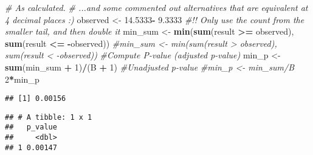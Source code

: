 \documentclass[]{article}
\newenvironment{Shaded}{\begin{snugshade}}{\end{snugshade}}
\newcommand{\KeywordTok}[1]{\textcolor[rgb]{0.13,0.29,0.53}{\textbf{#1}}}
\newcommand{\DataTypeTok}[1]{\textcolor[rgb]{0.13,0.29,0.53}{#1}}
\newcommand{\DecValTok}[1]{\textcolor[rgb]{0.00,0.00,0.81}{#1}}
\newcommand{\FloatTok}[1]{\textcolor[rgb]{0.00,0.00,0.81}{#1}}
\newcommand{\StringTok}[1]{\textcolor[rgb]{0.31,0.60,0.02}{#1}}
\newcommand{\CommentTok}[1]{\textcolor[rgb]{0.56,0.35,0.01}{\textit{#1}}}
\newcommand{\OperatorTok}[1]{\textcolor[rgb]{0.81,0.36,0.00}{\textbf{#1}}}
\newcommand{\NormalTok}[1]{#1}
\begin{document}
\begin{Shaded}
\begin{Highlighting}[]
\CommentTok{# As calculated.}
\CommentTok{# ...and some commented out alternatives that are equivalent at 4 decimal places :)}
\NormalTok{observed <-}\StringTok{ }\FloatTok{14.5333}\OperatorTok{-}\StringTok{ }\FloatTok{9.3333} 
\CommentTok{#!! Only use the count from the smaller tail, and then double it}
\NormalTok{min_sum <-}\StringTok{ }\KeywordTok{min}\NormalTok{(}\KeywordTok{sum}\NormalTok{(result }\OperatorTok{>=}\StringTok{ }\NormalTok{observed), }\KeywordTok{sum}\NormalTok{(result }\OperatorTok{<=}\StringTok{ }\OperatorTok{-}\NormalTok{observed))}
\CommentTok{#min_sum <- min(sum(result > observed), sum(result < -observed))}
\CommentTok{#Compute P-value (adjusted p-value)}
\NormalTok{min_p <-}\StringTok{ }\KeywordTok{sum}\NormalTok{(min_sum }\OperatorTok{+}\StringTok{ }\DecValTok{1}\NormalTok{)}\OperatorTok{/}\NormalTok{(B }\OperatorTok{+}\StringTok{ }\DecValTok{1}\NormalTok{)}
\CommentTok{#Unadjusted p-value}
\CommentTok{#min_p <- min_sum/B}
\DecValTok{2}\OperatorTok{*}\NormalTok{min_p}
\end{Highlighting}
\end{Shaded}

\begin{verbatim}
## [1] 0.00156
\end{verbatim}

\begin{Shaded}
\end{Shaded}

\begin{verbatim}
## # A tibble: 1 x 1
##   p_value
##     <dbl>
## 1 0.00147
\end{verbatim}
\end{document}
